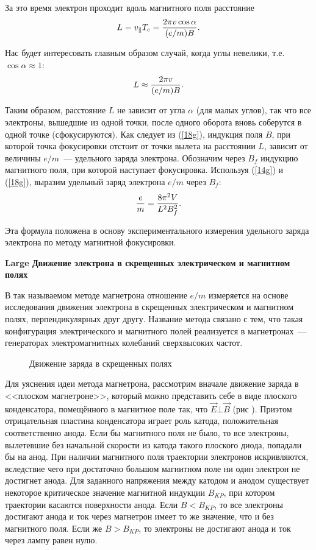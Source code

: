 За это время электрон проходит вдоль магнитного поля расстояние
\begin{equation}
	\eqmark{17}
L = v_{\parallel}T_c =\frac{2\pi v\cos\alpha}{(e/m)B}.
\end{equation}

Нас будет интересовать главным образом случай, когда углы невелики, т.е. $\cos\alpha \approx 1$:
\begin{equation}
	\eqmark{18g}
L \approx \frac{2\pi v}{(e/m)B}.
\end{equation}

Таким образом, расстояние $L$ не зависит от угла $\alpha$ (для малых углов), так что все электроны, вышедшие из одной точки, после одного оборота вновь соберутся в одной точке (сфокусируются). Как следует из (\eqref{18g}), индукция поля $B$, при которой точка фокусировки отстоит от точки вылета на расстоянии $L$, зависит от величины $e/m$~--- удельного заряда электрона. Обозначим через $B_f$ индукцию магнитного поля, при которой наступает фокусировка. Используя (\eqref{14g}) и (\eqref{18g}), выразим удельный заряд электрона $e/m$ через $B_f$:
\begin{equation}
	\eqmark{19g}
\frac{e}{m}=\frac{8\pi^2 V}{L^2B_f^2}.
\end{equation}

Эта формула положена в основу экспериментального измерения удельного заряда электрона по \textsf{методу магнитной
фокусировки}.

{\bf Large Движение электрона в скрещенных электрическом и магнитном полях}

В так называемом {\textsf{методе магнетрона}} отношение $e/m$ измеряется на основе исследования движения электрона в скрещенных электрическом и магнитном полях, перпендикулярных друг другу. Название метода связано с тем, что такая
конфигурация электрического и магнитного полей реализуется в магнетронах~--- генераторах электромагнитных колебаний
сверхвысоких частот.

\begin{figure}
	\caption{Движение заряда в скрещенных полях}
\end{figure}

Для уяснения идеи метода магнетрона, рассмотрим вначале движение заряда в <<плоском магнетроне>>, который можно
представить себе в виде плоского конденсатора, помещённого в магнитное поле так, что $\vec{E}\bot\vec{B}$ (рис ). Приэтом отрицательная пластина конденсатора играет роль катода, положительная соответственно анода. Если бы магнитного поля не было, то все электроны, вылетевшие без начальной скорости из катода такого плоского диода, попадали бы на анод. При наличии магнитного поля траектории электронов искривляются, вследствие чего при достаточно большом магнитном поле ни один электрон не достигнет анода. Для заданного напряжения между катодом и анодом существует некоторое критическое значение магнитной индукции $B_{KP}$, при котором траектории касаются поверхности анода. Если $B<B_{KP}$, то все электроны достигают анода и ток через магнетрон имеет то же значение, что и без магнитного поля. Если же $B>B_{KP}$, то электроны не достигают анода и ток через лампу равен нулю.

